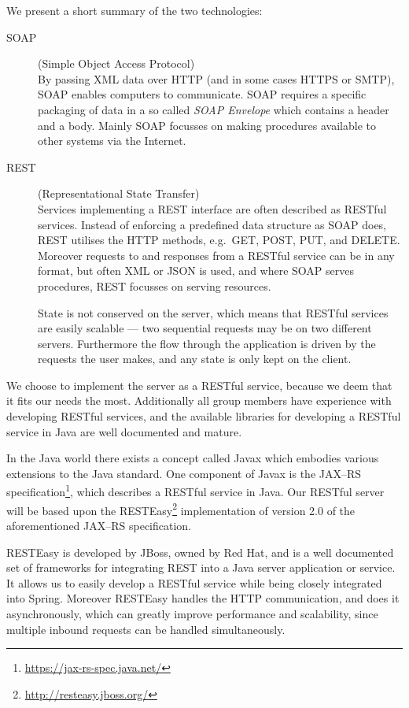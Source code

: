 We present a short summary of the two technologies:
\begin{description}
    \item[SOAP] (Simple Object Access Protocol)\cite{SOAP_spec}\hfill\\
        By passing XML data over HTTP (and in some cases HTTPS or SMTP), SOAP enables computers to communicate.
        SOAP requires a specific packaging of data in a so called \textit{SOAP Envelope} which contains a header and a body.
        Mainly SOAP focusses on making procedures available to other systems via the Internet.
    \item[REST] (Representational State Transfer)\cite{RESTful_best_practices}\hfill\\
        Services implementing a REST interface are often described as RESTful services.
        Instead of enforcing a predefined data structure as SOAP does, REST utilises the HTTP methods, e.g.~GET, POST, PUT, and DELETE.
        Moreover requests to and responses from a RESTful service can be in any format, but often XML or JSON is used,
        and where SOAP serves procedures, REST focusses on serving resources.

        State is not conserved on the server, which means that RESTful services are easily scalable --- two sequential requests may be on two different servers.
        Furthermore the flow through the application is driven by the requests the user makes, and any state is only kept on the client.
\end{description}

We choose to implement the server as a RESTful service, because we deem that it fits our needs the most.
Additionally all group members have experience with developing RESTful services, and the available libraries for developing a RESTful service in Java are well documented and mature.

\bigskip
In the Java world there exists a concept called Javax which embodies various extensions to the Java standard.
One component of Javax is the JAX--RS specification\footnote{\url{https://jax-rs-spec.java.net/}}, which describes a RESTful service in Java.
Our RESTful server will be based upon the RESTEasy\footnote{\url{http://resteasy.jboss.org/}} implementation of version 2.0 of the aforementioned JAX--RS specification.

RESTEasy is developed by JBoss, owned by Red Hat, and is a well documented set of frameworks for integrating REST into a Java server application or service.
It allows us to easily develop a RESTful service while being closely integrated into Spring.
Moreover RESTEasy handles the HTTP communication, and does it asynchronously, which can greatly improve performance and scalability,
since multiple inbound requests can be handled simultaneously.

